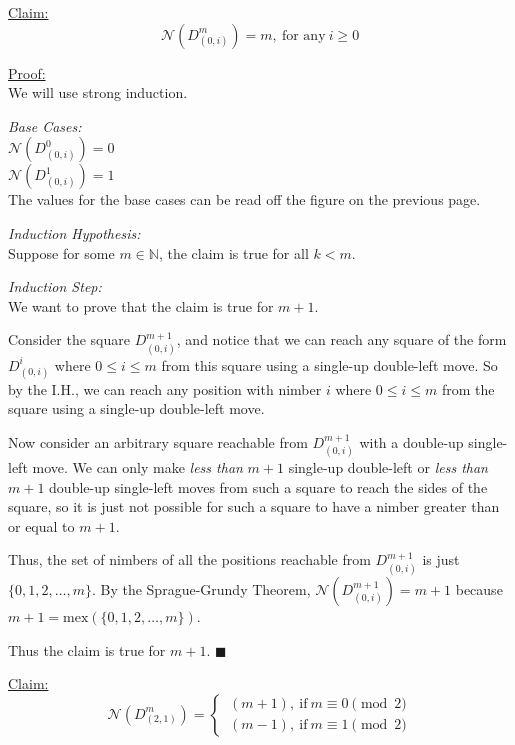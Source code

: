 \documentclass{article}
\newcommand{\N}{\mathbb{N}}
\newcommand{\I}[1]{\textit{#1}}
\newcommand{\T}[1]{\text{#1}}
\newcommand{\nim}{\mathcal{N}}
\newcommand{\D}[2]{D_{#1}^{#2}}
\newenvironment{claim}[1]{\par\noindent\underline{Claim:}\space#1}{}
\newenvironment{claimproof}[1]{\par\noindent\underline{Proof:}\space#1}
{\hfill $\blacksquare$}
\begin{document}
\begin{claim}
\begin{equation*}
  \nim(\D{(0,i)}{m}) = m,\ \T{for any}\ i \geq 0
\end{equation*}
\end{claim}

\begin{claimproof}\mbox{}\\
We will use strong induction.
\medskip

\I{Base Cases:} \\
$\nim(\D{(0,i)}{0}) = 0$ \\
$\nim(\D{(0,i)}{1}) = 1$ \\
The values for the base cases can be read off the
figure on the previous page.
\medskip

\I{Induction Hypothesis:} \\
Suppose for some $m \in \N$, the claim is true for all $k < m$.
\medskip

\I{Induction Step:} \\
We want to prove that the claim is true for $m + 1$.
\smallskip

Consider the square $\D{(0,i)}{m+1}$, and notice that
we can reach any square of the form $\D{(0,i)}{i}$ where
$0 \leq i \leq m$ from this square using a single-up double-left
move. 
So by the I.H., we can reach any position with nimber $i$ where
$0 \leq i \leq m$ from the square using a single-up double-left
move.
\smallskip

Now consider an arbitrary square reachable from $\D{(0,i)}{m+1}$
with a double-up single-left move. We can only make \I{less than}
$m+1$ single-up double-left or \I{less than} $m+1$ double-up single-left
moves from such a square to reach the sides of the square, so
it is just not possible for such a square to have a nimber
greater than or equal to $m+1$.
\smallskip

Thus, the set of nimbers of all the positions reachable from
$\D{(0,i)}{m+1}$ is just $\{0,1,2,\ldots,m\}$. By the
Sprague-Grundy Theorem, $\nim(\D{(0,i)}{m+1}) = m+1$ because
$m+1 = \T{mex}(\{0,1,2,\ldots,m\})$.
\smallskip

Thus the claim is true for $m+1$.
\end{claimproof}
\newpage

\begin{claim}
\begin{equation*}
  \nim(\D{(2,1)}{m}) =
  \begin{cases}
    \, (m+1), \ \T{if}\ m \equiv 0 \pmod{2} \\
    \, (m-1), \ \T{if}\ m \equiv 1 \pmod{2}
  \end{cases}
\end{equation*}
\end{claim}
\end{document}
